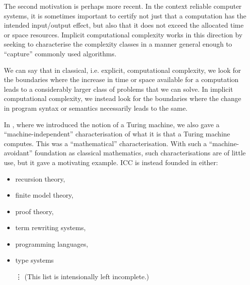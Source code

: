 

The second motivation is perhaps more recent. In the context reliable computer
systems, it is sometimes important to certify not just that a computation has
the intended input/output effect, but also that it does not exceed the
allocated time or space resources. Implicit computational complexity works in
this direction by seeking to characterise the complexity classes in a manner
general enough to ``capture'' commonly used algorithms.

We can say that in classical, i.e. explicit, computational complexity, we look
for the boundaries where the increase in time or space available for a
computation leads to a considerably larger class of problems that we can solve.
In implicit computational complexity, we instead look for the boundaries where
the change in program syntax or semantics necessarily leads to the same.

In , where we introduced the notion of a Turing machine,
we also gave a ``machine-independent'' characterisation of what it is that a
Turing machine computes. This was a ``mathematical'' characterisation. With
such a ``machine-avoidant'' foundation as classical mathematics, such
characterisations are of little use, but it gave a motivating example. ICC is
instead founded in either:

\begin{itemize}

\item recursion theory\cite{cobham-1965, clote-1990,
bellantoni-cook-1992, leivant-1995, ishihara-1999, kristiansen-2005,
marion-2009},

\item finite model theory\cite{fagin-1974, vardi-1982, immerman-1982,
immerman-1986, immerman-1987},

\item proof theory\cite{girard-scedorov-scott-1992, leivant-1994, girard-1998,
asperti-roversi-2002, lafont-2004, dal-lago-hofmann-2010},


\item term rewriting
systems\cite{beckmann-weiermann-1996, bonfante-et-al-1999, avanzini-et-al-2012,
de-carvalho-simonsen-2014},

\item programming languages\cite{voda-1994, jones-1999,
kristiansen-niggl-2004, kristiansen-voda-2005, niggl-wunderlich-2006},

\item type systems\cite{hofmann-2000b, crary-weirich-2000,
bellantoni-et-al-2000, hofmann-2003}

\hspace{-0.125in}\vdots\hspace{0.06in} (This list is intensionally left incomplete.)

\end{itemize}

